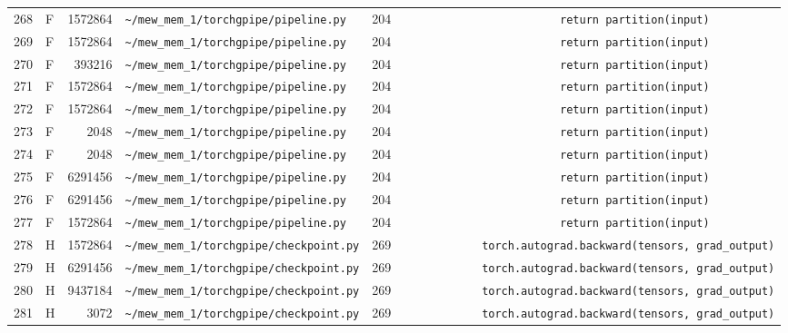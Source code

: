 \documentclass{article}
\begin{document}
\begin{longtable}{r l r p{6.5cm} r p{7.0cm}}
268 & F & 1572864 & \lstinline|~/mew_mem_1/torchgpipe/pipeline.py| & 204 & \lstinline|                        return partition(input)| \\
269 & F & 1572864 & \lstinline|~/mew_mem_1/torchgpipe/pipeline.py| & 204 & \lstinline|                        return partition(input)| \\
270 & F & 393216 & \lstinline|~/mew_mem_1/torchgpipe/pipeline.py| & 204 & \lstinline|                        return partition(input)| \\
271 & F & 1572864 & \lstinline|~/mew_mem_1/torchgpipe/pipeline.py| & 204 & \lstinline|                        return partition(input)| \\
272 & F & 1572864 & \lstinline|~/mew_mem_1/torchgpipe/pipeline.py| & 204 & \lstinline|                        return partition(input)| \\
273 & F & 2048 & \lstinline|~/mew_mem_1/torchgpipe/pipeline.py| & 204 & \lstinline|                        return partition(input)| \\
274 & F & 2048 & \lstinline|~/mew_mem_1/torchgpipe/pipeline.py| & 204 & \lstinline|                        return partition(input)| \\
275 & F & 6291456 & \lstinline|~/mew_mem_1/torchgpipe/pipeline.py| & 204 & \lstinline|                        return partition(input)| \\
276 & F & 6291456 & \lstinline|~/mew_mem_1/torchgpipe/pipeline.py| & 204 & \lstinline|                        return partition(input)| \\
277 & F & 1572864 & \lstinline|~/mew_mem_1/torchgpipe/pipeline.py| & 204 & \lstinline|                        return partition(input)| \\
278 & H & 1572864 & \lstinline|~/mew_mem_1/torchgpipe/checkpoint.py| & 269 & \lstinline|            torch.autograd.backward(tensors, grad_output)| \\
279 & H & 6291456 & \lstinline|~/mew_mem_1/torchgpipe/checkpoint.py| & 269 & \lstinline|            torch.autograd.backward(tensors, grad_output)| \\
280 & H & 9437184 & \lstinline|~/mew_mem_1/torchgpipe/checkpoint.py| & 269 & \lstinline|            torch.autograd.backward(tensors, grad_output)| \\
281 & H & 3072 & \lstinline|~/mew_mem_1/torchgpipe/checkpoint.py| & 269 & \lstinline|            torch.autograd.backward(tensors, grad_output)| \\
\end{longtable}
\end{document}

